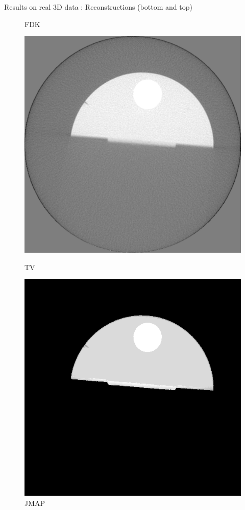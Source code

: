 \documentclass[latex]{beamer}
\begin{document}
\begin{frame}{}
\begin{block}{Results on real 3D data : Reconstructions (bottom and top)}
\begin{figure}
\begin{minipage}[htb]{0.30\linewidth}
\caption*{FDK}
\end{minipage} \hfill
\begin{minipage}[htb]{0.30\linewidth}
\centering
\includegraphics[scale=0.19]{volumeIQI_TVProj300Haut.png}
\caption*{TV}
\end{minipage} \hfill
\begin{minipage}[htb]{0.30\linewidth}
\centering
\includegraphics[scale=0.19]{volumeIQI_JMAPPottsIndGamma3K4Proj300Haut.png}
\caption*{JMAP}
\end{minipage}
\end{figure}
\end{block}
\end{frame}
\end{document}
